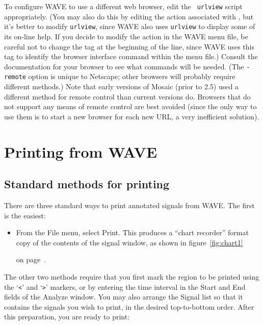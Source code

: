 \documentclass[twoside]{book}
\newcommand{\WAVE}{{\sf WAVE}\xspace}
\begin{document}
To configure \WAVE{} to use a different web browser, edit the {\tt
urlview} script appropriately.  (You may also do this by editing the
action associated with {\tt <Open URL>}, but it's better to modify
{\tt urlview}, since \WAVE{} also uses {\tt urlview} to display some
of its on-line help.  If you decide to modify the action in the
\WAVE{} menu file, be careful not to change the {\tt <Open URL>} tag
at the beginning of the line, since \WAVE{} uses this tag to identify
the browser interface command within the menu file.)  Consult the
documentation for your browser to see what commands will be needed.
(The {\tt -remote} option is unique to Netscape; other browsers will
probably require different methods.)  Note that early versions of
Mosaic (prior to 2.5) used a different method for remote control than
current versions do.  Browsers that do not support any means of remote
control are best avoided (since the only way to use them is to start a
new browser for each new URL, a very inefficient solution).

\chapter{Printing from \WAVE{}}

\label{ch:printing}
\section{Standard methods for printing}
There are three standard ways to print annotated signals from \WAVE{}.
The first is the easiest:

\begin{itemize}
\item
From the {\sf File} menu, select {\sf Print}.  This produces a ``chart
recorder'' format copy of the contents of the signal window, as shown
in figure~\ref{fig:chart1}
\begin{latexonly}
on page~\pageref{fig:chart1}.
\end{latexonly}
\end{itemize}

The other two methods require that you first mark the region to be
printed using the `{\tt <}' and `{\tt >}' markers, or by entering the
time interval in the {\sf Start} and {\sf End} fields of the {\sf
Analyze} window.  You may also arrange the {\sf Signal list} so that
it contains the signals you wish to print, in the desired top-to-bottom order.
After this preparation, you are ready to print:
\end{document}
